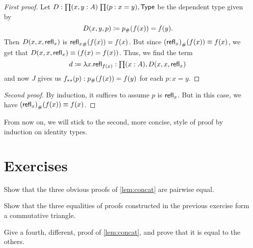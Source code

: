 \begin{proof}[First proof]
  Let $D:\prd{x,y:A}{p:x=y} \type$ be the dependent type given by
  \begin{equation*}
    D(x,y,p)\coloneqq {p}_{\#}\!\left({f(x)}\right)= f(y).
  \end{equation*}
  Then $D(x,x,\mathsf{refl}_{x})$ is ${\mathsf{refl}_{x}}_{\#}\!\left({f(x)}\right)= f(x)$.
  But since ${(\mathsf{refl}_{x})}_{\#}\!\left({f(x)}\right)\equiv f(x)$, we get that $D(x,x,\mathsf{refl}_{x})\equiv (f(x)= f(x))$.
  Thus, we find the term
  \begin{equation*}
    d\defeq\lambda x.\refl{f(x)}:\prd{x:A} D(x,x,\refl{x})
  \end{equation*}
  and now $J$ gives us ${f}_{**}\!\left({p}\right):{p}_{\#}\!\left({f(x)}\right)= f(y)$ for each $p:x= y$.
\end{proof}

\begin{proof}[Second proof]
  By induction, it suffices to assume $p$ is $\mathsf{refl}_{x}$.
  But in this case, we have ${(\mathsf{refl}_{x})}_{\#}\!\left({f(x)}\right)\equiv f(x)$.
\end{proof}

From now on, we will stick to the second, more concise, style of proof by induction on identity types.

\section*{Exercises}
\label{basics:exercises}

\begin{ex}\label{ex:basics:concat}
  Show that the three obvious proofs of \autoref{lem:concat} are pairwise equal.
\end{ex}

\begin{ex}
  Show that the three equalities of proofs constructed in the previous exercise form a commutative triangle.
\end{ex}

\begin{ex}
  Give a fourth, different, proof of \autoref{lem:concat}, and prove that it is equal to the others.
\end{ex}

